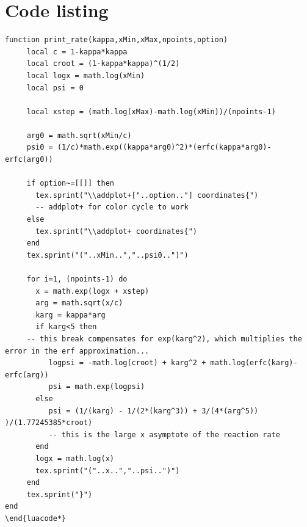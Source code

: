 \chapter{Code listing}

%
%

\begin{lstlisting}
function print_rate(kappa,xMin,xMax,npoints,option)
     local c = 1-kappa*kappa
     local croot = (1-kappa*kappa)^(1/2)
     local logx = math.log(xMin)
     local psi = 0

     local xstep = (math.log(xMax)-math.log(xMin))/(npoints-1)

     arg0 = math.sqrt(xMin/c)
     psi0 = (1/c)*math.exp((kappa*arg0)^2)*(erfc(kappa*arg0)-erfc(arg0))

     if option~=[[]] then
       tex.sprint("\\addplot+["..option.."] coordinates{")
       -- addplot+ for color cycle to work
     else
       tex.sprint("\\addplot+ coordinates{")
     end
     tex.sprint("("..xMin..","..psi0..")")

     for i=1, (npoints-1) do
       x = math.exp(logx + xstep)
       arg = math.sqrt(x/c)
       karg = kappa*arg
       if karg<5 then
     -- this break compensates for exp(karg^2), which multiplies the error in the erf approximation...
          logpsi = -math.log(croot) + karg^2 + math.log(erfc(karg)-erfc(arg))
          psi = math.exp(logpsi)
       else
          psi = (1/(karg) - 1/(2*(karg^3)) + 3/(4*(arg^5)) )/(1.77245385*croot)
          -- this is the large x asymptote of the reaction rate
       end
       logx = math.log(x)
       tex.sprint("("..x..","..psi..")")
     end
     tex.sprint("}")
end
\end{luacode*}
\end{lstlisting}
